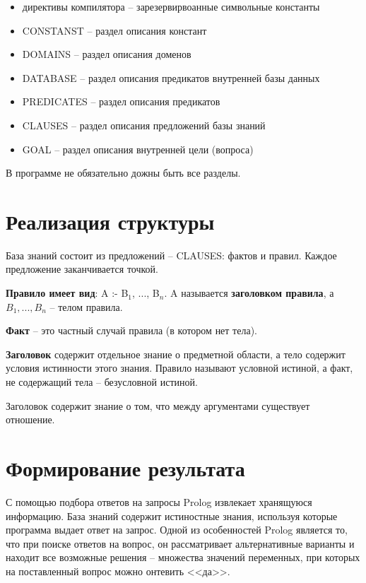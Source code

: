 \begin{itemize}
    \item директивы компилятора -- зарезервирвоанные символьные константы
    \item CONSTANST -- раздел описания констант
    \item DOMAINS -- раздел описания доменов
    \item DATABASE -- раздел описания предикатов внутренней базы данных
    \item PREDICATES -- раздел описания предикатов
    \item CLAUSES -- раздел описания предложений базы знаний
    \item GOAL -- раздел описания внутренней цели (вопроса)
\end{itemize}

В программе не обязательно дожны быть все разделы.

\section{Реализация структуры}

База знаний состоит из предложений -- CLAUSES: фактов и правил.
Каждое предложение заканчивается точкой.

\textbf{Правило имеет вид}: { \ttfamily A :- B$_1$, ..., B$_n$. } A называется \textbf{заголовком правила}, а $B_1, ..., B_n$ -- телом правила.

\textbf{Факт} -- это частный случай правила (в котором нет тела).

\textbf{Заголовок} содержит отдельное знание о предметной области, а тело содержит условия истинности этого знания. Правило называют условной истиной, а факт, не содержащий тела -- безусловной истиной.

Заголовок содержит знание о том, что между аргументами существует отношение.

\section{Формирование результата}

С помощью подбора ответов на запросы Prolog извлекает хранящуюся информацию. База знаний содержит истиностные знания, используя которые программа выдает ответ на запрос. Одной из особенностей Prolog является то, что при поиске ответов на вопрос, он рассматривает альтернативные варианты и находит все возможные решения -- множества значений переменных, при которых на поставленный вопрос можно онтевить <<да>>.
